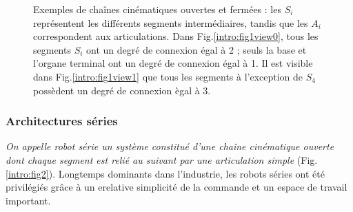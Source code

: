 \begin{figure}[!ht]
  \centering
       \hfill
    \caption{\footnotesize{Exemples de cha\^ines cinématiques ouvertes et fermées : les $S_i$ représentent les différents segments intermédiaires, tandis que les $A_i$ correspondent aux articulations. Dans Fig.\ref{intro:fig1view0}, tous les segments $S_i$ ont un degré de connexion égal à 2 ; seuls la base et l'organe terminal ont un degré de connexion égal à 1. Il est visible dans Fig.\ref{intro:fig1view1} que tous les segments à l'exception de $S_4$ possèdent un degré de connexion ègal à 3.}}
\label{intro:fig1}
\end{figure}

\subsubsection{Architectures séries}

{\it On appelle robot série un système constitué d'une chaîne cinématique ouverte dont chaque segment est relié au suivant par une articulation simple} (Fig.\ref{intro:fig2}). Longtemps dominants dans l'industrie, les robots séries ont été privilégiés grâce à un erelative simplicité de la commande et un espace de travail important.

